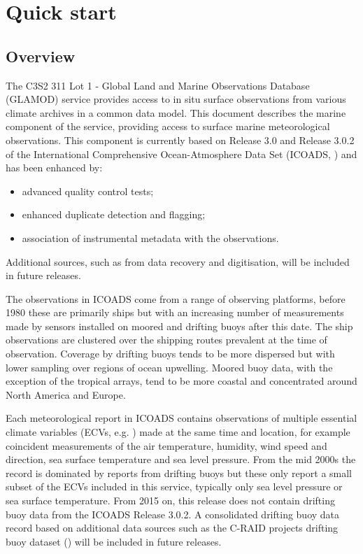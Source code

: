 \section{Quick start}
\subsection{Overview}

The C3S2 311 Lot 1 - Global Land and Marine Observations Database (GLAMOD) service provides access to in situ surface observations from various climate archives in a common data model.
This document describes the marine component of the service, providing access to surface marine meteorological observations.
This component is currently based on Release 3.0 and Release 3.0.2 of the International Comprehensive Ocean-Atmosphere Data Set (ICOADS, \cite{Freeman2017,Liu2022}) and has been enhanced by: 
\begin{itemize}
\item advanced quality control tests; 
\item enhanced duplicate detection and flagging; 
\item association of instrumental metadata with the observations. 
\end{itemize}
Additional sources, such as from data recovery and digitisation, will be included in future releases.

The observations in ICOADS come from a range of observing platforms, before 1980 these are primarily ships but with an increasing number of measurements made by sensors installed on moored and drifting buoys after this date. 
The ship observations are clustered over the shipping routes prevalent at the time of observation. 
Coverage by drifting buoys tends to be more dispersed but with lower sampling over regions of ocean upwelling. 
Moored buoy data, with the exception of the tropical arrays, tend to be more coastal and concentrated around North America and Europe.

Each meteorological report in ICOADS contains observations of multiple essential climate variables (ECVs, e.g. \cite{Bojinski2014}) made at the same time and location, for example coincident measurements of the air temperature, humidity, wind speed and direction, sea surface temperature and sea level pressure.
From the mid 2000s the record is dominated by reports from drifting buoys but these only report a small subset of the ECVs included in this service, typically only sea level pressure or sea surface temperature.
From 2015 on, this release does not contain drifting buoy data from the ICOADS Release 3.0.2.
A consolidated drifting buoy data record based on additional data sources such as the C-RAID projects drifting buoy dataset (\cite{craid}) will be included in future releases.

